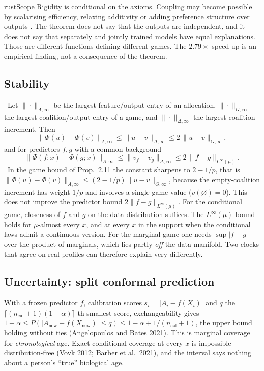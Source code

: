 \documentclass[11pt,a4paper]{article}
\newenvironment{scope}{\begin{callout}{rust}{Scope}}{\end{callout}}
\theoremstyle{plain}
\theoremstyle{definition}
\theoremstyle{remark}
\newcommand{\tagbox}[2]{\tcbox[on line,boxsep=1pt,left=2pt,right=2pt,top=0pt,bottom=0pt,
  colback=#1!12!white,colframe=#1,boxrule=0.4pt,arc=1pt]{\scriptsize\bfseries\color{#1}#2}}
\newcommand{\REP}{\tagbox{teal}{REPORTED}}
\newcommand{\NEW}{\tagbox{plum}{NEW HERE}}
\begin{document}
\begin{scope}
Rigidity is conditional on the axioms. Coupling may become possible by scalarising efficiency, relaxing additivity or adding preference structure over outputs \PII[§2.4]. The theorem does not say that the outputs are independent, and it does not say that separately and jointly trained models have equal explanations. Those are different functions defining different games. The $2.79\times$ speed-up is an empirical finding, not a consequence of the theorem.
\end{scope}

\subsection{Stability}
\label{sec:stability}
\REP\ Let $\|\cdot\|_{A,\infty}$ be the largest feature/output entry of an allocation, $\|\cdot\|_{G,\infty}$ the largest coalition/output entry of a game, and $\|\cdot\|_{\Delta,\infty}$ the largest coalition increment. Then \PII[Prop.~2.11, p.~9]
\[
\|\Phi(u)-\Phi(v)\|_{A,\infty}\le\|u-v\|_{\Delta,\infty}\le2\,\|u-v\|_{G,\infty},
\]
and for predictors $f,g$ with a common background \PII[Prop.~2.13, p.~11]
\[
\|\Phi(f;x)-\Phi(g;x)\|_{A,\infty}\le\|v_f-v_g\|_{\Delta,\infty}\le2\,\|f-g\|_{L^\infty(\mu)} .
\]
\NEW\ In the game bound of Prop.~2.11 the constant sharpens to $2-1/p$, that is $\|\Phi(u)-\Phi(v)\|_{A,\infty}\le(2-1/p)\|u-v\|_{G,\infty}$, because the empty-coalition increment has weight $1/p$ and involves a single game value ($v(\varnothing)=0$). This does not improve the predictor bound $2\|f-g\|_{L^\infty(\mu)}$. For the conditional game, closeness of $f$ and $g$ on the data distribution suffices. The $L^\infty(\mu)$ bound holds for $\mu$-almost every $x$, and at every $x$ in the support when the conditional laws admit a continuous version. For the marginal game one needs $\sup|f-g|$ over the product of marginals, which lies partly \emph{off} the data manifold. Two clocks that agree on real profiles can therefore explain very differently.

\subsection{Uncertainty: split conformal prediction}
\label{sec:conformal}
With a frozen predictor $f$, calibration scores $s_i=|A_i-f(X_i)|$ and $q$ the $\lceil(n_{\mathrm{cal}}+1)(1-\alpha)\rceil$-th smallest score, exchangeability gives
$1-\alpha\le P(|A_{\mathrm{new}}-f(X_{\mathrm{new}})|\le q)\le1-\alpha+1/(n_{\mathrm{cal}}+1)$, the upper bound holding without ties (Angelopoulos and Bates 2021). This is marginal coverage for \emph{chronological} age. Exact conditional coverage at every $x$ is impossible distribution-free (Vovk 2012; Barber et al.\ 2021), and the interval says nothing about a person's ``true'' biological age.
\end{document}
